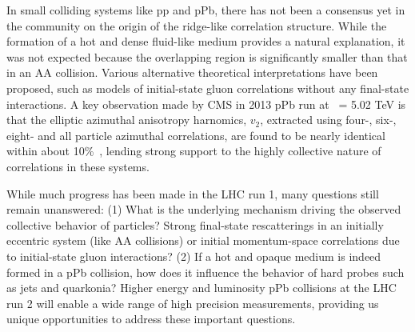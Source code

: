 In small colliding systems like pp and pPb, there has not been a consensus yet
in the community on the origin of the ridge-like correlation structure. 
While the formation of a hot and dense fluid-like medium provides a natural explanation, 
it was not expected because the overlapping region is significantly smaller than 
that in an AA collision. Various alternative theoretical interpretations have been 
proposed, such as models of initial-state gluon correlations without any final-state interactions.
A key observation made by CMS in 2013 pPb run at \rootsNN\ = 5.02 TeV is that
the elliptic azimuthal anisotropy harnomics, $v_2$, extracted using four-, six-,
eight- and all particle azimuthal correlations, are found to be nearly identical
within about 10\%~\cite{Khachatryan:2015waa}, lending strong support to the highly 
collective nature of correlations in these systems. 

While much progress has been made in the LHC run 1, many questions still remain unanswered:
(1) What is the underlying mechanism driving the observed collective behavior of particles? 
Strong final-state rescatterings in an initially eccentric system (like AA collisions) or 
initial momentum-space correlations due to initial-state gluon interactions? (2) If a hot and opaque 
medium is indeed formed in a pPb collision, how does it influence the behavior of hard probes
such as jets and quarkonia? Higher energy and luminosity pPb collisions at the LHC run 2 
will enable a wide range of high precision measurements, providing us unique opportunities 
to address these important questions. 